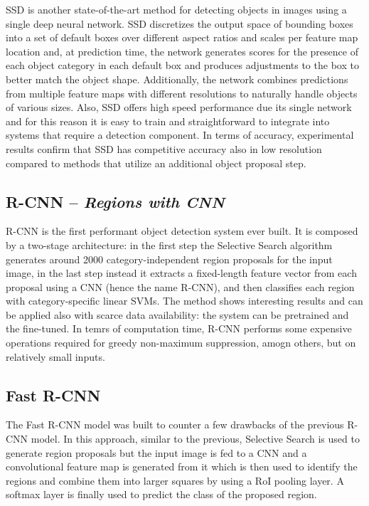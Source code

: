 SSD \cite{liu2016ssd} is another state-of-the-art method for detecting
objects in images using a single deep neural network. SSD discretizes
the output space of bounding boxes into a set of default boxes over
different aspect ratios and scales per feature map location and, at
prediction time, the network generates scores for the presence of each
object category in each default box and produces adjustments to the
box to better match the object shape. Additionally, the network
combines predictions from multiple feature maps with diﬀerent
resolutions to naturally handle objects of various sizes. Also, SSD
offers high speed performance due its single network and for this
reason it is easy to train and straightforward to integrate into
systems that require a detection component. In terms of accuracy,
experimental results conﬁrm that SSD has competitive accuracy also in
low resolution compared to methods that utilize an additional object
proposal step.

\subsection{R-CNN -- \emph{Regions with CNN}}

R-CNN \cite{girshick2014rich} is the first performant object detection
system ever built. It is composed by a two-stage architecture: in the
first step the Selective Search algorithm generates around 2000
category-independent region proposals for the input image, in the last
step instead it extracts a fixed-length feature vector from each
proposal using a CNN (hence the name R-CNN), and then classifies each
region with category-specific linear SVMs. The method shows
interesting results and can be applied also with scarce data
availability: the system can be pretrained and the fine-tuned. In
temrs of computation time, R-CNN performs some expensive operations
required for greedy non-maximum suppression, amogn others, but on
relatively small inputs.

\subsection{Fast R-CNN}

The Fast R-CNN \cite{girshick2015fast} model was built to counter a
few drawbacks of the previous R-CNN model. In this approach, similar
to the previous, Selective Search is used to generate region proposals
but the input image is fed to a CNN and a convolutional feature map is
generated from it which is then used to identify the regions and
combine them into larger squares by using a RoI pooling layer. A
softmax layer is finally used to predict the class of the proposed
region.

